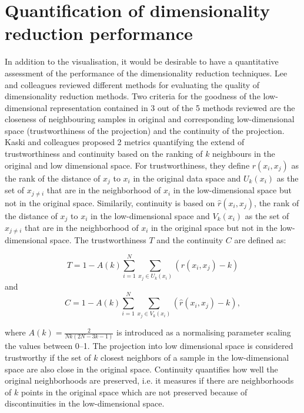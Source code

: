 \section{Quantification of dimensionality reduction performance}
\label{section:Quantification-DimRed}
In addition to the visualisation, it would be desirable to have a quantitative assessment of the performance of the dimensionality reduction techniques. Lee and colleagues \citeyear{Lee2009} reviewed different methods for evaluating the quality of dimensionality reduction methods. Two criteria for the goodness of the low-dimensional representation contained in \num{3} out of the \num{5} methods reviewed are the closeness of neighbouring samples in original and corresponding low-dimensional space (trustworthiness of the projection) and the continuity of the projection. Kaski and colleagues \citep{Kaski2003} proposed \num{2} metrics quantifying the extend of trustworthiness and continuity based on the ranking of \(k\) neighbours in the original and low dimensional space. For trustworthiness, they define \(r(x_i, x_j)\) as the rank of the distance of \(x_j\) to  \(x_i\) in the original data space and \(U_k(x_i)\) as the set of \(x_{j \neq i}\) that are in the neighborhood of \(x_i\) in the low-dimensional space but not in the original space. Similarily, continuity is based on \(\hat{r}(x_i, x_j)\), the rank of the distance of \(x_j\) to  \(x_i\) in the low-dimensional space and \(V_k(x_i)\) as the set of \(x_{j \neq i}\) that are in the neighborhood of \(x_i\) in the original space but not in the low-dimensional space. The trustworthiness \(T\) and the continuity \(C\) are defined as:

\begin{equation}
T =  1- A(k)\sum^{N}_{i=1}\sum^{}_{x_j \in U_k(x_i)}(r(x_i, x_j) - k)
\label{eq:trustworthiness}
\end{equation}
and 
\begin{equation}
C =  1- A(k)\sum^{N}_{i=1}\sum^{}_{x_j \in V_k(x_i)}(\hat{r}(x_i, x_j) - k),
\label{eq:continuity}
\end{equation}

where \(A(k) = \frac{2}{Nk(2N -3k -1)}\) is introduced as a normalising parameter scaling the values between \numrange{0}{1}. The projection into low dimensional space is considered trustworthy if the set of \(k\) closest neighbors of a sample in the low-dimensional space are also close in the original space. Continuity quantifies how well the original neighborhoods are preserved, i.e. it measures if there are neighborhoods of \(k\) points in the original space which are not preserved because of discontinuities in the low-dimensional space. 

